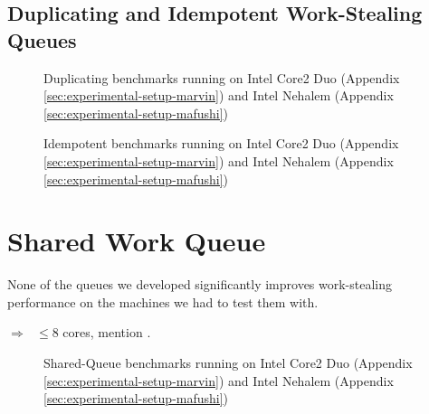 \subsection{Duplicating and Idempotent Work-Stealing Queues}
\label{sec:performance-alternative-duplicating}

\begin{figure}[ht]
  \centering
  \caption{Duplicating benchmarks running on Intel Core2 Duo (Appendix
    \ref{sec:experimental-setup-marvin}) and Intel Nehalem (Appendix
    \ref{sec:experimental-setup-mafushi})}
  \label{fig:queues-evaluation-threads}
\end{figure}

\begin{figure}[ht]
  \centering
  \caption{Idempotent benchmarks running on Intel Core2 Duo (Appendix
    \ref{sec:experimental-setup-marvin}) and Intel Nehalem (Appendix
    \ref{sec:experimental-setup-mafushi})}
  \label{fig:queues-evaluation-threads}
\end{figure}

\section{Shared Work Queue}
\label{sec:queues-performance-shared-queue}

None of the queues we developed significantly improves work-stealing
performance on the machines we had to test them with.

$\Rightarrow\text{ }\le 8$ cores, mention \cite{Saha2007}.

\begin{figure}[ht]
  \centering
  \caption{Shared-Queue benchmarks running on Intel Core2 Duo (Appendix
    \ref{sec:experimental-setup-marvin}) and Intel Nehalem (Appendix
    \ref{sec:experimental-setup-mafushi})}
  \label{fig:queues-evaluation-threads}
\end{figure}


